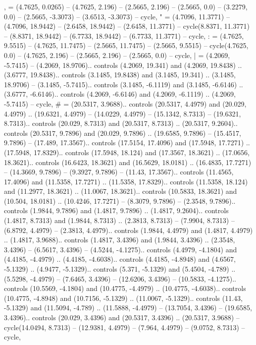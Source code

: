 {,} = {(4.7625, 0.0265) -- (4.7625, 2.196) -- (2.5665, 2.196) -- (2.5665, 0.0) -- (3.2279, 0.0) -- (2.5665, -3.3073) -- (3.6513, -3.3073) -- cycle},
{"} = {(4.7096, 11.3771) -- (4.7096, 18.9442) -- (2.6458, 18.9442) -- (2.6458, 11.3771) -- cycle(8.8371, 11.3771) -- (8.8371, 18.9442) -- (6.7733, 18.9442) -- (6.7733, 11.3771) -- cycle},
{:} = {(4.7625, 9.5515) -- (4.7625, 11.7475) -- (2.5665, 11.7475) -- (2.5665, 9.5515) -- cycle(4.7625, 0.0) -- (4.7625, 2.196) -- (2.5665, 2.196) -- (2.5665, 0.0) -- cycle},
{|} = {(4.2069, -5.7415) -- (4.2069, 18.9706).. controls (4.2069, 19.341) and (4.2069, 19.8438) .. (3.6777, 19.8438).. controls (3.1485, 19.8438) and (3.1485, 19.341) .. (3.1485, 18.9706) -- (3.1485, -5.7415).. controls (3.1485, -6.1119) and (3.1485, -6.6146) .. (3.6777, -6.6146).. controls (4.2069, -6.6146) and (4.2069, -6.1119) .. (4.2069, -5.7415) -- cycle},
{\#} = {(20.5317, 3.9688).. controls (20.5317, 4.4979) and (20.029, 4.4979) .. (19.6321, 4.4979) -- (14.0229, 4.4979) -- (15.1342, 8.7313) -- (19.6321, 8.7313).. controls (20.029, 8.7313) and (20.5317, 8.7313) .. (20.5317, 9.2604).. controls (20.5317, 9.7896) and (20.029, 9.7896) .. (19.6585, 9.7896) -- (15.4517, 9.7896) -- (17.489, 17.3567).. controls (17.5154, 17.4096) and (17.5948, 17.7271) .. (17.5948, 17.8329).. controls (17.5948, 18.124) and (17.3567, 18.3621) .. (17.0656, 18.3621).. controls (16.6423, 18.3621) and (16.5629, 18.0181) .. (16.4835, 17.7271) -- (14.3669, 9.7896) -- (9.3927, 9.7896) -- (11.43, 17.3567).. controls (11.4565, 17.4096) and (11.5358, 17.7271) .. (11.5358, 17.8329).. controls (11.5358, 18.124) and (11.2977, 18.3621) .. (11.0067, 18.3621).. controls (10.5833, 18.3621) and (10.504, 18.0181) .. (10.4246, 17.7271) -- (8.3079, 9.7896) -- (2.3548, 9.7896).. controls (1.9844, 9.7896) and (1.4817, 9.7896) .. (1.4817, 9.2604).. controls (1.4817, 8.7313) and (1.9844, 8.7313) .. (2.3813, 8.7313) -- (7.9904, 8.7313) -- (6.8792, 4.4979) -- (2.3813, 4.4979).. controls (1.9844, 4.4979) and (1.4817, 4.4979) .. (1.4817, 3.9688).. controls (1.4817, 3.4396) and (1.9844, 3.4396) .. (2.3548, 3.4396) -- (6.5617, 3.4396) -- (4.5244, -4.1275).. controls (4.4979, -4.1804) and (4.4185, -4.4979) .. (4.4185, -4.6038).. controls (4.4185, -4.8948) and (4.6567, -5.1329) .. (4.9477, -5.1329).. controls (5.371, -5.1329) and (5.4504, -4.789) .. (5.5298, -4.4979) -- (7.6465, 3.4396) -- (12.6206, 3.4396) -- (10.5833, -4.1275).. controls (10.5569, -4.1804) and (10.4775, -4.4979) .. (10.4775, -4.6038).. controls (10.4775, -4.8948) and (10.7156, -5.1329) .. (11.0067, -5.1329).. controls (11.43, -5.1329) and (11.5094, -4.789) .. (11.5888, -4.4979) -- (13.7054, 3.4396) -- (19.6585, 3.4396).. controls (20.029, 3.4396) and (20.5317, 3.4396) .. (20.5317, 3.9688) -- cycle(14.0494, 8.7313) -- (12.9381, 4.4979) -- (7.964, 4.4979) -- (9.0752, 8.7313) -- cycle},
